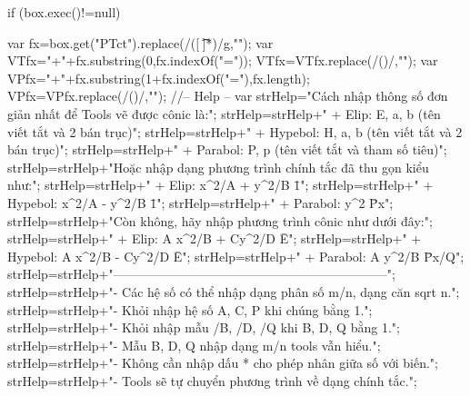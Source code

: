 if (box.exec()!=null){
	var fx=box.get("PTct").replace(/([ \t\*]*)/g,"");
	var VTfx="+"+fx.substring(0,fx.indexOf("="));
	VTfx=VTfx.replace(/(\+\-)/,"\-");
	var VPfx="+"+fx.substring(1+fx.indexOf("="),fx.length);
	VPfx=VPfx.replace(/(\+\-)/,"\-");
	//-- Help --
	var strHelp="Cách nhập thông số đơn giản nhất để Tools vẽ được cônic là:\n";
	strHelp=strHelp+"       + Elip:              E, a, b          (tên viết tắt và 2 bán trục)\n";
	strHelp=strHelp+"       + Hypebol:     H, a, b          (tên viết tắt và 2 bán trục)\n";
	strHelp=strHelp+"       + Parabol:       P, p             (tên viết tắt và tham số tiêu)\n";
	strHelp=strHelp+"Hoặc nhập dạng phương trình chính tắc đã thu gọn kiểu như:\n";
	strHelp=strHelp+"       + Elip:              x^2/A + y^2/B \= 1\n";
	strHelp=strHelp+"       + Hypebol:     x^2/A  - y^2/B \= 1\n";
	strHelp=strHelp+"       + Parabol:       y^2 \= Px\n";
	strHelp=strHelp+"Còn không, hãy nhập phương trình cônic như dưới đây:\n";
	strHelp=strHelp+"       + Elip:              A x^2/B + Cy^2/D \= E\n";
	strHelp=strHelp+"       + Hypebol:     A x^2/B  - Cy^2/D \= E\n";
	strHelp=strHelp+"       + Parabol:       A y^2/B \= Px/Q\n";
	strHelp=strHelp+"-----------------------------------------------------------------\n";
	strHelp=strHelp+"- Các hệ số có thể nhập dạng phân số m/n, dạng căn sqrt n.\n";
	strHelp=strHelp+"- Khỏi nhập hệ số A, C, P khi chúng bằng 1.\n";
	strHelp=strHelp+"- Khỏi nhập mẫu /B, /D, /Q khi B, D, Q bằng 1.\n";
	strHelp=strHelp+"- Mẫu B, D, Q nhập dạng m/n tools vẫn hiểu.\n";
	strHelp=strHelp+"- Không cần nhập dấu * cho phép nhân giữa số với biến.\n";
	strHelp=strHelp+"- Tools sẽ tự chuyển phương trình về dạng chính tắc.\n";
	
}
